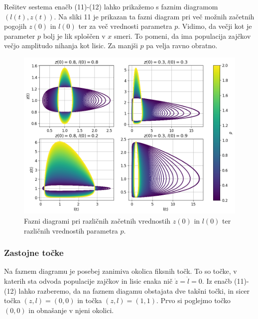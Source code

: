 \documentclass[slovene,11pt,a4paper]{article}
\begin{document}
Rešitev sestema enačb (11)-(12) lahko prikažemo s faznim diagramom $(l(t), z(t))$. Na sliki 11 je prikazan ta fazni diagram pri več možnih začetnih pogojih $z(0)$ in $l(0)$ ter za več vrednosti parametra $p$. Vidimo, da večji kot je parameter $p$ bolj je lik sploščen v $x$ smeri. To pomeni, da ima populacija zajčkov večjo amplitudo nihanja kot lisic. Za manjši $p$ pa velja ravno obratno.

\begin{figure}[h!]
\centering
\includegraphics[width=13.5cm]{zajci3.png}
\caption{Fazni diagrami pri različnih začetnih vrednostih $z(0)$ in $l(0)$ ter različnih vrednostih parametra $p$.}
\end{figure}

\subsubsection{Zastojne točke}

Na faznem diagramu je posebej zanimiva okolica fiksnih točk. To so točke, v katerih sta odvoda populacije zajčkov in lisic enaka nič $\dot{z} = \dot{l} = 0$. Iz enačb (11)-(12) lahko razberemo, da na faznem diagamu obstajata dve takšni točki, in sicer točka $(z,l) = (0,0)$ in točka $(z,l) = (1,1)$. Prvo si poglejmo točko $(0,0)$ in obnašanje v njeni okolici.
\end{document}

